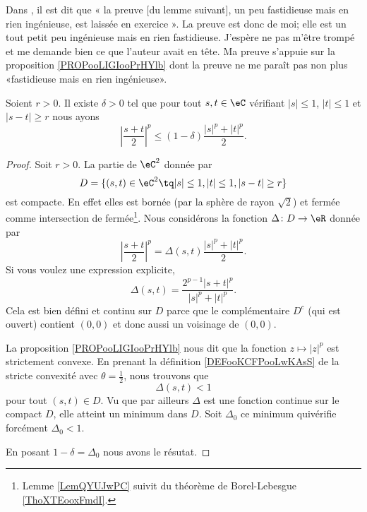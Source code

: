 Dans \cite{ooHGADooNGZnbt}, il est dit que « la preuve [du lemme suivant], un peu fastidieuse mais en rien ingénieuse, est laissée en exercice ». La preuve est donc de moi; elle est un tout petit peu ingénieuse mais en rien fastidieuse. J'espère ne pas m'être trompé et me demande bien ce que l'auteur avait en tête. Ma preuve s'appuie sur la proposition \ref{PROPooLIGIooPrHYlb} dont la preuve ne me paraît pas non plus «fastidieuse mais en rien ingénieuse».

\begin{lemma}        \label{LEMooLDQRooEGWDlm}
    Soient \( r>0\). Il existe \( \delta>0\) tel que pour tout \( s,t\in \eC\) vérifiant \( | s |\leq 1\), \( | t |\leq 1\) et \( | s-t |\geq r\) nous ayons
    \begin{equation}
        \left| \frac{ s+t }{ 2 } \right|^p\leq (1-\delta)\frac{ | s |^p+| t |^p }{2}.
    \end{equation}
\end{lemma}

\begin{proof}
    Soit \( r>0\). La partie de \( \eC^2\) donnée par
    \begin{equation}
        D=\{ (s,t)\in \eC^2\tq | s |\leq 1, | t |\leq 1,| s-t |\geq r \}
    \end{equation}
    est compacte. En effet elles est bornée (par la sphère de rayon \( \sqrt{ 2 }\)) et fermée comme intersection de fermée\footnote{Lemme \ref{LemQYUJwPC} suivit du théorème de Borel-Lebesgue \ref{ThoXTEooxFmdI}.}. Nous considérons la fonction \( \Delta\colon D\to \eR\) donnée par
    \begin{equation}
        \left| \frac{ s+t }{2} \right|^p=\Delta(s,t)\frac{ | s |^p+| t |^p }{2}.
    \end{equation}
    Si vous voulez une expression explicite,
    \begin{equation}
        \Delta(s,t)=\frac{ 2^{p-1}| s+t |^p }{ | s |^p+| t |^p }.
    \end{equation}
    Cela est bien défini et continu sur \( D\) parce que le complémentaire \( D^c\) (qui est ouvert) contient \( (0,0)\) et donc aussi un voisinage de \( (0,0)\).

    La proposition \ref{PROPooLIGIooPrHYlb} nous dit que la fonction \( z\mapsto | z |^p\) est strictement convexe. En prenant la définition \ref{DEFooKCFPooLwKAsS} de la stricte convexité avec \( \theta=\frac{ 1 }{2}\), nous trouvons que
    \begin{equation}
        \Delta(s,t)<1
    \end{equation}
    pour tout \( (s,t)\in D\). Vu que par ailleurs \( \Delta\) est une fonction continue sur le compact \( D\), elle atteint un minimum dans \( D\). Soit \( \Delta_0\) ce minimum quivérifie forcément \( \Delta_0<1\).

    En posant \( 1-\delta=\Delta_0\) nous avons le résutat.
\end{proof}

